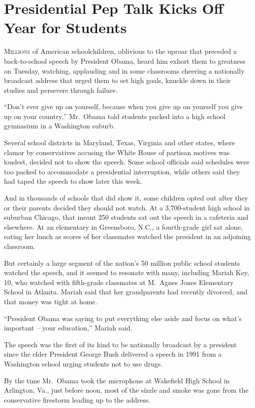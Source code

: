 ﻿\documentclass[12pt]{article}
\begin{document}
\section{Presidential Pep Talk Kicks Off Year for Students}

\lettrine{M}{illions} of American schoolchildren, oblivious to the uproar that preceded a
back-to-school speech by President Obama, heard him exhort them to greatness on Tuesday, watching,
applauding and in some classrooms cheering a nationally broadcast address that urged them to set
high goals, knuckle down in their studies and persevere through failure.

``Don't ever give up on yourself, because when you give up on yourself you give up on your
country,'' Mr.~Obama told students packed into a high school gymnasium in a Washington suburb.

Several school districts in Maryland, Texas, Virginia and other states, where clamor by
conservatives accusing the White House of partisan motives was loudest, decided not to show the
speech. Some school officials said schedules were too packed to accommodate a presidential
interruption, while others said they had taped the speech to show later this week.

And in thousands of schools that did show it, some children opted out after they or their parents
decided they should not watch. At a 3,700-student high school in suburban Chicago, that meant 250
students sat out the speech in a cafeteria and elsewhere. At an elementary in Greensboro, N.C., a
fourth-grade girl sat alone, eating her lunch as scores of her classmates watched the president in
an adjoining classroom.

But certainly a large segment of the nation's 50 million public school students watched the speech,
and it seemed to resonate with many, including Mariah Key, 10, who watched with fifth-grade
classmates at M.~Agnes Jones Elementary School in Atlanta. Mariah said that her grandparents had
recently divorced, and that money was tight at home.

``President Obama was saying to put everything else aside and focus on what's important -- your
education,'' Mariah said.

The speech was the first of its kind to be nationally broadcast by a president since the elder
President George Bush delivered a speech in 1991 from a Washington school urging students not to use
drugs.

By the time Mr.~Obama took the microphone at Wakefield High School in Arlington, Va., just before
noon, most of the sizzle and smoke was gone from the conservative firestorm leading up to the
address.
\end{document}
